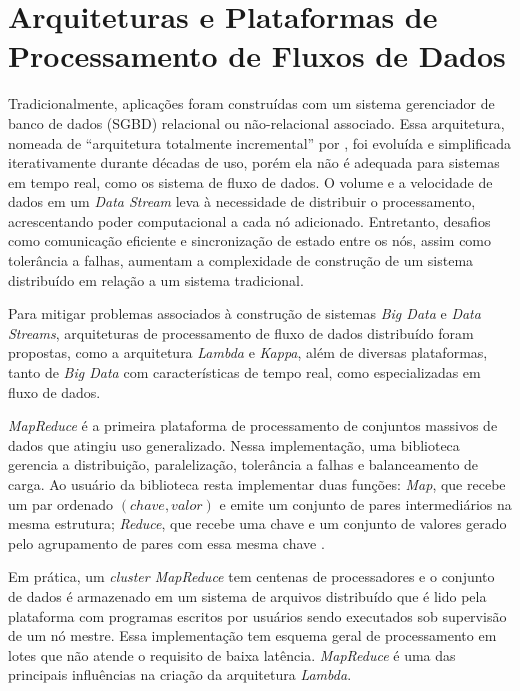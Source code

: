 \section{Arquiteturas e Plataformas de Processamento de Fluxos de Dados}
\label{sec:frameworks}

Tradicionalmente, aplicações
foram construídas com um sistema gerenciador de
banco de dados (SGBD) relacional ou não-relacional associado.
Essa arquitetura,
nomeada de ``arquitetura totalmente incremental'' por ,
foi evoluída e simplificada iterativamente durante décadas de uso, porém ela não
é adequada para sistemas em tempo real, como os sistema de fluxo de dados.
O volume e a velocidade de dados em um \emph{Data Stream} leva à necessidade de
distribuir o processamento, acrescentando poder computacional a cada nó
adicionado.
Entretanto, desafios como comunicação eficiente e sincronização de estado
entre os nós, assim como tolerância a falhas, aumentam a complexidade de
construção de um sistema distribuído em relação a um sistema tradicional.

\newcommand{\lambdaa}{\xspace\emph{Lambda}\xspace}
\newcommand{\kappaa}{\xspace\emph{Kappa}\xspace}

Para mitigar problemas associados à construção de sistemas \emph{Big Data}
e \emph{Data Streams},
arquiteturas de processamento de fluxo
de dados distribuído foram propostas, como a arquitetura \lambdaa
\cite{marz2015big} e \kappaa \cite{Kreps2014}, além
de
diversas plataformas, tanto de \emph{Big Data} com características de tempo real,
como especializadas em fluxo de dados.

\emph{MapReduce} é a primeira plataforma de processamento de conjuntos massivos
de dados que atingiu uso generalizado.
Nessa implementação, uma biblioteca gerencia a distribuição, paralelização,
tolerância a falhas e balanceamento de carga.
Ao usuário da biblioteca resta implementar duas funções:
\emph{Map}, que recebe um par ordenado
$(chave, valor)$ e emite um conjunto de pares intermediários na mesma estrutura;
\emph{Reduce}, que recebe uma chave e um conjunto de valores gerado pelo agrupamento
de pares com essa mesma chave \cite{Dean2004}.

Em prática, um \emph{cluster MapReduce} tem centenas de processadores e o
conjunto de dados é armazenado em um sistema de arquivos distribuído que é lido
pela plataforma com programas escritos por usuários sendo executados sob
supervisão de um nó mestre.
Essa implementação tem esquema geral de processamento em lotes que não atende o
requisito de baixa latência.
\nobreakdash \emph{MapReduce} é uma das principais influências na criação da arquitetura \lambdaa \cite{marz2015big}.

